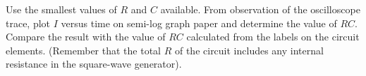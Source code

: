 Use the smallest values of $R$ and $C$ available. From observation of the oscilloscope trace, plot $I$ versus time on semi-log graph paper and determine the value of $RC$. Compare the result with the value of $RC$ calculated from the labels on the circuit elements. (Remember that the total $R$ of the circuit includes any internal resistance in the square-wave generator).

